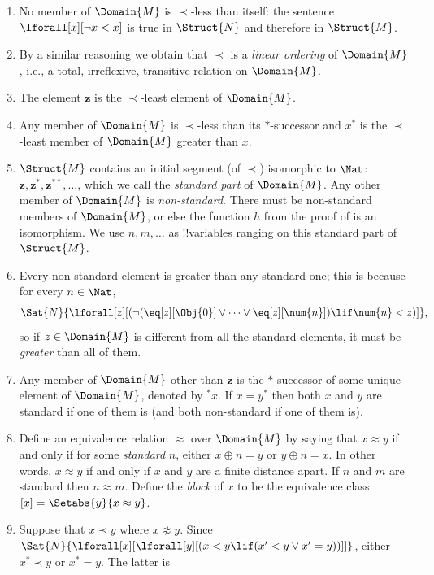\documentclass[../../../include/open-logic-section]{subfiles}
\begin{document}
\begin{enumerate}
\item No member of $\Domain{M}$ is $\prec$-less than itself: the sentence
  $\lforall[x][\lnot x < x]$ is true in $\Struct{N}$ and therefore in
  $\Struct{M}$.
\item By a similar reasoning we obtain that $\prec$ is a \emph{linear
    ordering} of $\Domain{M}$, i.e., a total, irreflexive, transitive relation
  on $\Domain{M}$. 
\item The element $\mathbf{z}$ is the $\prec$-least element of $\Domain{M}$.
\item Any member of $\Domain{M}$ is $\prec$-less than its $*$-successor and
  $x^*$ is the $\prec$-least member of $\Domain{M}$ greater than $x$.
\item $\Struct{M}$ contains an initial segment (of $\prec$) isomorphic
  to $\Nat$: $\mathbf{z}, \mathbf{z}^*, \mathbf{z}^{**}, \dots$, which
  we call the \emph{standard part} of $\Domain{M}$. Any other member
  of $\Domain{M}$ is \emph{non-standard}. There must be non-standard
  members of $\Domain{M}$, or else the function $h$ from the proof of
   is an isomorphism.  We use $n, m, \dots$ as
  !!{variable}s ranging on this standard part of $\Struct{M}$.
\item Every non-standard element is greater than any standard one;
  this is because for every $n \in \Nat$,
  \[
  \Sat{N}{\lforall[z][(\lnot(\eq[z][\Obj{0}] \lor
  \dots \lor \eq[z][\num{n}]) \lif \num{n} < z)]},
  \]
  so if $z \in \Domain{M}$ is different from all the standard
  elements, it must be \emph{greater} than all of them.
\item Any member of $\Domain{M}$ other than $\mathbf{z}$ is the
  $*$-successor of some unique element of $\Domain{M}$, denoted by
  $^*x$. If $x = y^*$ then both $x$ and $y$ are standard if one of
  them is (and both non-standard if one of them is).
\item Define an equivalence relation $\approx$ over $\Domain{M}$ by
  saying that $x \approx y$ if and only if for some \emph{standard}
  $n$, either $x \oplus n = y$ or $y \oplus n =x$. In other words, $x
  \approx y$ if and only if $x$ and $y$ are a finite distance
  apart. If $n$ and $m$ are standard then $n \approx m$. Define the
  \emph{block} of $x$ to be the equivalence class $[x] = \Setabs{y}{x
  \approx y}$.
\item Suppose that $x \prec y$ where $x \not\approx y$. Since
  $\Sat{N}{\lforall[x][\lforall[y][(x < y \lif (x' < y \lor x' =
      y))]]}$, either $x^* \prec y$ or $x^* = y$. The latter is

\end{enumerate}
\end{document}
